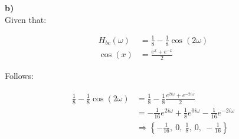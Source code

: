 \textbf{b)} \\
Given that:

\begin{align}
	H_{bc}(\omega) &= \frac{1}{8} - \frac{1}{8} \cos(2\omega) \\
	\cos(x) &= \frac{e^x + e^{-x}}{2}
\end{align}

Follows:

\begin{align*}
	\frac{1}{8} - \frac{1}{8} \cos(2\omega) &= \frac{1}{8} - \frac{1}{8} \frac{e^{2i\omega} + e^{-2i\omega}}{2} \\ 
	&= -\frac{1}{16} e^{2i\omega} + \frac{1}{8} e^{0i\omega} - \frac{1}{16} e^{-2i\omega} \\
	&\Rightarrow \left\{ -\frac{1}{16},\ 0,\ \frac{1}{8},\ 0,\ -\frac{1}{16} \right\}
\end{align*}
